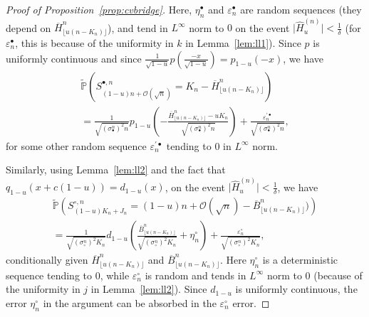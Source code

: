 \documentclass[10pt]{amsart}
\theoremstyle{definition}\newtheorem{defi}[theo]{Definition}\newtheorem{rema}[theo]{Remark}\newtheorem{exam}[theo]{Example}\newtheorem{exem}[theo]{Example}\newtheorem{nota}[theo]{Notation}
\def\scn{\sigma_{\circ}^{n}}
\def\sbn{\sigma_{\bullet}^{n}}
\def\Sbn{S^{\bullet,n}}
\def\Scn{S^{\circ,n}}
\def\oB{\overline{B}}
\def\oH{\overline{H}}
\def\hH{\widehat{H}}
\renewcommand{\epsilon}{\varepsilon}
\newcommand\tPr[1]{\tilde{\mathbb{P}}\left(#1\right)}
\begin{document}
\begin{proof}[Proof of Proposition~\ref{prop:cvbridge}]
Here, $\eta^{\bullet}_{n}$ and $\epsilon^{\bullet}_{n}$ are random sequences
(they depend on $\oH^{n}_{ \lfloor u (n-K_{n}) \rfloor}$),
and tend in $L^\infty$ norm to $0$
on the event $ \big| \hH^{(n)}_{u} \big| < \tfrac{1}{\delta}$
(for $\epsilon^{\bullet}_{n}$, this is because of the uniformity in $k$ in Lemma~\ref{lem:ll1}).
Since $p$ is uniformly continuous
and since $\tfrac{1}{\sqrt{1-u}}p(\tfrac{-x}{\sqrt{1-u}})=p_{1-u}(-x)$,
we have
\begin{multline}
  \tPr{\Sbn_{(1-u)n+\mathcal O(\sqrt{n})}=K_{n}-\oH^{n}_{ \lfloor u (n-K_{n}) \rfloor}}\\
=\frac{1}{\sqrt{ (\sbn)^{2}  n} }p_{1-u}\left( -\frac{\oH^{n}_{ \lfloor u (n-K_{n}) \rfloor }
- u K_{n}}{ \sqrt{ (\sbn)^{2} n} }\right) + \frac{\epsilon^{'\bullet}_{n}}{\sqrt{ (\sbn)^{2}  n}},
\label{eq:PSbn}
\end{multline}
for some other random sequence $\epsilon^{'\bullet}_{n}$ tending to $0$ in $L^\infty$ norm.


Similarly, using Lemma~\ref{lem:ll2} and the fact that  $q_{1-u}(x+c(1-u))=d_{1-u}(x)$,
on the event $ \big| \hH^{(n)}_{u} \big| < \tfrac{1}{\delta}$,
we have
\begin{multline}
\tPr{\Scn_{(1-u) K_{n}+ J_{n}}= (1-u)n+\mathcal O(\sqrt{n})-\oB^{n}_{\lfloor u (n-K_{n}) \rfloor})}\\
   =  \frac{1}{ \sqrt{ (\scn)^{2} K_{n} } } d_{1-u} \left( \frac{\oB^{n}_{\lfloor u (n-K_{n}) \rfloor}}{\sqrt{ (\scn)^{2} K_{n} }}+ \eta^{\circ}_{n}\right)+  \frac{\epsilon^{\circ}_{n}}{\sqrt{ (\scn)^{2}  K_n}},
   \label{eq:PScn}
\end{multline}
conditionally given $\oH^{n}_{ \lfloor u (n-K_{n}) \rfloor }$ and $\oB^{n}_{ \lfloor u (n-K_{n}) \rfloor }$.
Here $\eta^{\circ}_{n}$ is a deterministic sequence tending to $0$,
while $\epsilon^{\circ}_{n}$ is random and tends in $L^\infty$ norm to $0$
(because of the uniformity in $j$ in Lemma~\ref{lem:ll2}).
Since $d_{1-u}$ is uniformly continuous, the error $\eta^{\circ}_{n}$ in the argument
can be absorbed in the $\epsilon^{\circ}_{n}$ error.


\end{proof}
\end{document}
